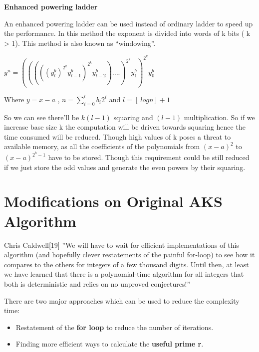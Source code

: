 \documentclass[a4paper,12pt]{article}
\begin{document}
\vspace{0.1in}
\begin{flushleft}
	\textbf{Enhanced powering ladder}
\end{flushleft}

An enhanced powering ladder can be used instead of ordinary ladder to speed up the performance. In this method the exponent is divided into words of k bits ( k > 1). This method is also known as “windowing”.

\begin{center}
	\(y^n = (((((y^b_{l})^{2^k}y^b_{l-1})^{2^k}y^b_{l-2})....)^{2^k}y^b_{1})^{2^k}y^b_{0}\)
\end{center}

\begin{center}
	Where \(y=x-a\) , \(n=\sum_{i=0}^{l}b_{i}2^i\) and \(l = \left\lfloor\ logn \right\rfloor +1 \)
\end{center}

So we can see there’ll be \(k(l-1)\) squaring and \((l-1)\) multiplication. So if we increase base size k the computation will be driven towards squaring hence the time consumed will be reduced.
\vspace{0.1in}
\newline
Though high values of k poses a threat to available memory, as all the coefficients of the polynomials from \((x-a)^2\) to \((x-a)^{2^k-1}\)  have to be stored. Though this requirement could be still reduced if we just store the odd values and generate the even powers by their squaring.

\newpage
\section{Modifications on Original AKS Algorithm}

Chris Caldwell[19] ”We will have to wait for efficient implementations of this algorithm (and hopefully clever restatements of the painful for-loop) to see how it compares to the others for integers of a few thousand digits. Until then, at least we have learned that there is a polynomial-time algorithm for all integers that both is deterministic and relies on no unproved conjectures!”

\begin{flushleft}
	There are two major approaches which can be used to reduce the complexity time:
\end{flushleft}
	\begin{itemize}
		\setlength{\itemindent}{0.05in}
		\item Restatement of the \textbf{for loop} to reduce the number of iterations.
		\item Finding more efficient ways to calculate the \textbf{useful prime r}.
	\end{itemize}
	
\end{document}
